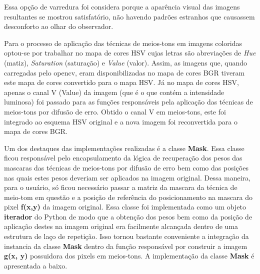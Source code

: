 \documentclass{article}
\begin{document}
Essa opção de varredura foi considera porque a aparência visual das imagens resultantes se mostrou satisfatório, não havendo padrões estranhos que causassem desconforto ao olhar do observador.

Para o processo de aplicação das técnicas de meios-tons em imagens coloridas optou-se por trabalhar no mapa de cores HSV cujas letras são abreviações de \textit{Hue} (matiz), \textit{Saturation} (saturação) e \textit{Value} (valor). Assim, as imagens que, quando carregadas pelo opencv, eram disponibilizadas no mapa de cores BGR tiveram este mapa de cores convertido para o mapa HSV. Já no mapa de cores HSV, apenas o canal V (Value) da imagem (que é o que contém a intensidade luminosa) foi passado para as funções responsáveis pela aplicação das técnicas de meios-tons por difusão de erro. Obtido o canal V em meios-tons, este foi integrado ao esquema HSV original e a nova imagem foi reconvertida para o mapa de cores BGR.

Um dos destaques das implementações realizadas é a classe \textbf{Mask}. Essa classe ficou responsável pelo encapsulamento da lógica de recuperação dos pesos das mascaras das técnicas de meios-tons por difusão de erro bem como das posições nas quais estes pesos deveriam ser aplicados na imagem original. Dessa maneira, para o usuário, só ficou necessário passar a matriz da mascara da técnica de meio-tom em questão e a posição de referência do posicionamento na mascara do pixel \textbf{f(x,y)} da imagem original. Essa classe foi implementada como um objeto \textbf{iterador} do Python de modo que a obtenção dos pesos bem como da posição de aplicação destes na imagem original era facilmente alcançada dentro de uma estrutura de laço de repetição. Isso tornou bastante conveniente a integração da instancia da classe \textbf{Mask} dentro da função responsável por construir a imagem \textbf{g(x, y)} possuidora dos pixels em meios-tons. A implementação da classe \textbf{Mask} é apresentada a baixo.
\end{document}
